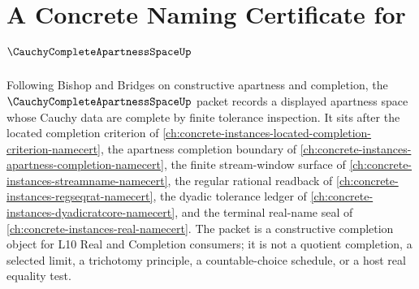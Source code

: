 \chapter{A Concrete Naming Certificate for $\CauchyCompleteApartnessSpaceUp$}
\label{ch:concrete-instances-cauchy-complete-apartness-space-namecert}

Following Bishop and Bridges on constructive apartness and completion, the $\CauchyCompleteApartnessSpaceUp$ packet records a displayed apartness space whose Cauchy data are complete by finite tolerance inspection. It sits after the located completion criterion of \autoref{ch:concrete-instances-located-completion-criterion-namecert}, the apartness completion boundary of \autoref{ch:concrete-instances-apartness-completion-namecert}, the finite stream-window surface of \autoref{ch:concrete-instances-streamname-namecert}, the regular rational readback of \autoref{ch:concrete-instances-regseqrat-namecert}, the dyadic tolerance ledger of \autoref{ch:concrete-instances-dyadicratcore-namecert}, and the terminal real-name seal of \autoref{ch:concrete-instances-real-namecert}. The packet is a constructive completion object for L10 Real and Completion consumers; it is not a quotient completion, a selected limit, a trichotomy principle, a countable-choice schedule, or a host real equality test.

